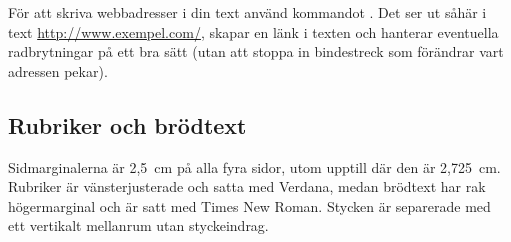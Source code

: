 För att skriva webbadresser i din text använd kommandot . Det
ser ut såhär i text \url{http://www.exempel.com/}, skapar en länk i texten och
hanterar eventuella radbrytningar på ett bra sätt (utan att stoppa in
bindestreck som förändrar vart adressen pekar).


\subsection{Rubriker och brödtext}

Sidmarginalerna är 2,5~cm på alla fyra sidor, utom upptill där den är 2,725~cm.
Rubriker är vänsterjusterade och satta med Verdana, medan brödtext har rak
högermarginal och är satt med Times New Roman. Stycken är separerade med ett
vertikalt mellanrum utan styckeindrag.

\medskip

